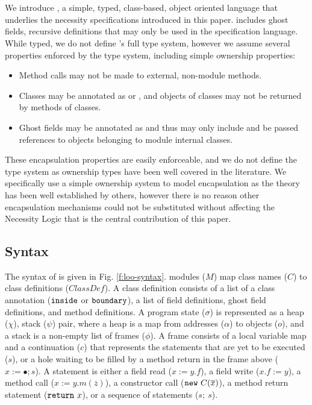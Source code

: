 
\section{\Loo}
\label{app:loo}


We introduce \Loo, a simple, typed, class-based, object oriented language that underlies the necessity specifications
introduced in this paper. \Loo includes ghost fields, recursive definitions that may only be
used in the specification language.
While typed, we do not define \Loo's
full type system, however we assume several properties enforced by the type system, including 
simple ownership properties:
\begin{itemize}
\item
Method calls may not be made to external, non-module methods.
\item
Classes may be annotated as  or , and objects of  classes may not be returned by methods of  classes.
\item
Ghost fields may be annotated as  and thus may only include and be passed references to objects belonging to module internal classes.
\end{itemize}
These encapsulation properties are easily enforceable, and we
do not define the type system as ownership types have been 
well covered in the literature. 
We specifically use a simple ownership system to model 
encapsulation as the theory has been well established by others, 
however there is no reason other encapsulation mechanisms could 
not be substituted without affecting the Necessity Logic that 
is the central contribution of this paper.

\subsection{Syntax}
The syntax of \Loo is given in Fig. \ref{f:loo-syntax}.
\Loo modules ($M$) map class names ($C$) to class definitions ($\textit{ClassDef}$).
A class definition consists of a list of a class annotation (${\texttt{inside}}$ or ${\texttt{boundary}}$),
a list of field definitions, ghost field definitions, and method definitions.
A program state ($\sigma$) is represented as a heap ($\chi$), stack ($\psi$) pair, 
where a heap is a map from addresses ($\alpha$) to objects ($o$), and a stack is a non-empty list of frames ($\phi$). A frame consists of a local variable
map and a continuation ($c$) that represents the statements that are yet to be executed ($s$),
or a hole waiting to be filled by a method return in the frame above ($x := \bullet; s$).
A statement is either a field read ($x := y.f$), a field write ($x.f := y$), a method call
($x := y.m(\overline{z})$), a constructor call ($\prg{new}\ C(\overline{x})$), a method return statement
(${\texttt{return}}\ x$), or a sequence of statements ($s;\ s$).

